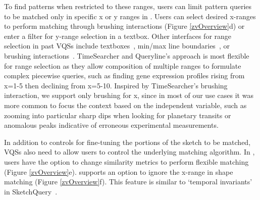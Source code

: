 \item To find patterns when restricted to these ranges, users can limit pattern queries to be matched only in specific x or y ranges in \zvpp. Users can select desired x-ranges to perform matching through brushing interactions (Figure \ref{zvOverview}d) or enter a filter for y-range selection in a textbox. Other interfaces for range selection in past VQSs
include textboxes~\cite{wattenberg2001sketching,Mannino2018}, min/max line boundaries~\cite{ryall2005querylines},
or brushing interactions~\cite{Hochheiser2001}. TimeSearcher and Queryline's approach is most flexible for range selection as
they allow composition of multiple ranges to formulate complex piecewise queries, such as finding gene expression profiles
rising from x=1-5 then declining from x=5-10. Inspired by TimeSearcher's brushing interaction, we support only brushing for x, since in most of our use cases it was more common to focus the context based on the independent variable, such as zooming into particular sharp dips when looking for planetary transits or anomalous peaks indicative of erroneous experimental measurements.
\item  In addition to controls for fine-tuning the portions of the sketch to be matched, VQSs also need to allow users to control the underlying matching algorithm. In \zvpp, users have the option to change similarity metrics to perform flexible matching (Figure \ref{zvOverview}e). \zvpp supports an option to ignore the x-range in shape matching (Figure \ref{zvOverview}f). This feature is similar to `temporal invariants' in SketchQuery~\cite{correll2016semantics}.
\enumend
